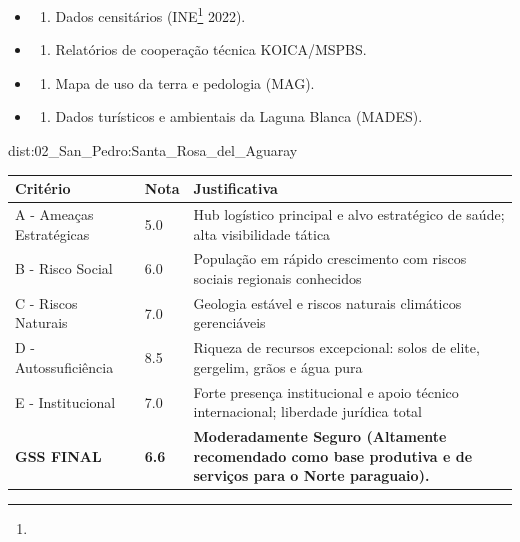 {\begin{itemize}
\tightlist
\item
  \begin{enumerate}
  \def\labelenumi{\arabic{enumi})}
  \tightlist
  \item
    Dados censitários (INE\footnote{\fineINE} 2022).
  \end{enumerate}
\item
  \begin{enumerate}
  \def\labelenumi{\arabic{enumi})}
  \setcounter{enumi}{1}
  \tightlist
  \item
    Relatórios de cooperação técnica KOICA/\allowbreak MSPBS.
  \end{enumerate}
\item
  \begin{enumerate}
  \def\labelenumi{\arabic{enumi})}
  \setcounter{enumi}{2}
  \tightlist
  \item
    Mapa de uso da terra e pedologia (MAG).
  \end{enumerate}
\item
  \begin{enumerate}
  \def\labelenumi{\arabic{enumi})}
  \setcounter{enumi}{3}
  \tightlist
  \item
    Dados turísticos e ambientais da Laguna Blanca (MADES).
  \end{enumerate}
\end{itemize}}{dist:02_San_Pedro:Santa_Rosa_del_Aguaray}
\begin{table}[ht!]
\small \begin{tabular}{p{3.0cm}p{0.8cm}p{6.0cm}} \toprule
\textbf{Critério} & \textbf{Nota} & \textbf{Justificativa} \\ \midrule
A - Ameaças Estratégicas & 5.0 & Hub logístico principal e alvo estratégico de saúde; alta visibilidade tática \\
B - Risco Social & 6.0 & População em rápido crescimento com riscos sociais regionais conhecidos \\
C - Riscos Naturais & 7.0 & Geologia estável e riscos naturais climáticos gerenciáveis \\
D - Autossuficiência & 8.5 & Riqueza de recursos excepcional: solos de elite, gergelim, grãos e água pura \\
E - Institucional & 7.0 & Forte presença institucional e apoio técnico internacional; liberdade jurídica total \\
\midrule \textbf{GSS FINAL} & \textbf{6.6} & \textbf{Moderadamente Seguro (Altamente recomendado como base produtiva e de serviços para o Norte paraguaio).} \\ \bottomrule \end{tabular}
\end{table}
